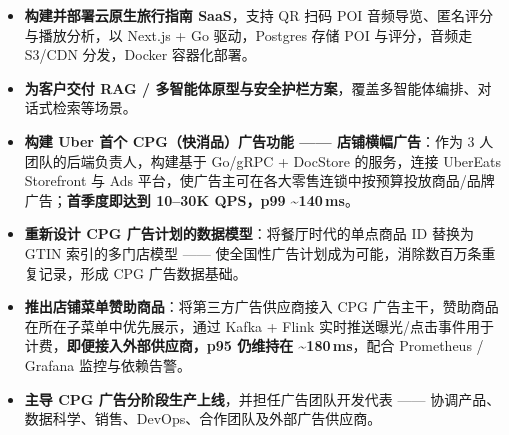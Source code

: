 \documentclass{resume_cn-v2}
\begin{document}
\begin{itemize}
  \item \textbf{构建并部署云原生旅行指南 SaaS}，支持 QR 扫码 POI 音频导览、匿名评分与播放分析，以 Next.js + Go 驱动，Postgres 存储 POI 与评分，音频走 S3/CDN 分发，Docker 容器化部署。
  \item \textbf{为客户交付 RAG / 多智能体原型与安全护栏方案}，覆盖多智能体编排、对话式检索等场景。
\end{itemize}

\begin{itemize}
  \item \textbf{构建 Uber 首个 CPG（快消品）广告功能 —— 店铺横幅广告}：作为 3 人团队的后端负责人，构建基于 Go/gRPC + DocStore 的服务，连接 UberEats Storefront 与 Ads 平台，使广告主可在各大零售连锁中按预算投放商品/品牌广告；\textbf{首季度即达到 10--30K QPS，p99 \textasciitilde140\,ms}。
  \item \textbf{重新设计 CPG 广告计划的数据模型}：将餐厅时代的单点商品 ID 替换为 GTIN 索引的多门店模型 —— 使全国性广告计划成为可能，消除数百万条重复记录，形成 CPG 广告数据基础。
  \item \textbf{推出店铺菜单赞助商品}：将第三方广告供应商接入 CPG 广告主干，赞助商品在所在子菜单中优先展示，通过 Kafka + Flink 实时推送曝光/点击事件用于计费，\textbf{即便接入外部供应商，p95 仍维持在 \textasciitilde180\,ms}，配合 Prometheus / Grafana 监控与依赖告警。
  \item \textbf{主导 CPG 广告分阶段生产上线}，并担任广告团队开发代表 —— 协调产品、数据科学、销售、DevOps、合作团队及外部广告供应商。
\end{itemize}
\end{document}
